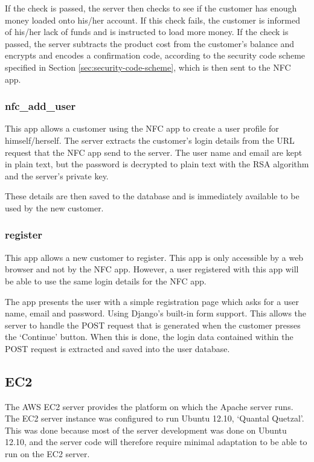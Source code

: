 If the check is passed, the server then checks to see if the customer has enough money loaded
onto his/her account. If this check fails, the customer is informed of his/her lack of funds
and is instructed to load more money. If the check is passed, the server subtracts the product
cost from the customer's balance and encrypts and encodes a confirmation code, according to the
security code scheme specified in Section \ref{sec:security-code-scheme}, which is then sent
to the NFC app. 

\subsubsection{nfc\_add\_user}

This app allows a customer using the NFC app to create a user profile for himself/herself. The
server extracts the customer's login details from the URL request that the NFC app send to the
server. The user name and email are kept in plain text, but the password is decrypted to
plain text with the RSA algorithm and the server's private key.

These details are then saved to the database and is immediately available to be used by the new
customer. 

\subsubsection{register}

This app allows a new customer to register. This app is only accessible by a web browser and
not by the NFC app. However, a user registered with this app will be able to use the same login
details for the NFC app.

The app presents the user with a simple registration page which asks for a user name, email and
password. Using Django's built-in form support. This allows the server to handle the
POST request that is generated when the customer presses the `Continue' button. When this is
done, the login data contained within the POST request is extracted and saved into the user
database. 

\subsection{EC2}

The AWS EC2 server provides the platform on which the Apache server runs. The EC2 server
instance was configured to run Ubuntu 12.10, `Quantal Quetzal'. This was done because most of
the server development was done on Ubuntu 12.10, and the server code will therefore require
minimal adaptation to be able to run on the EC2 server. 

